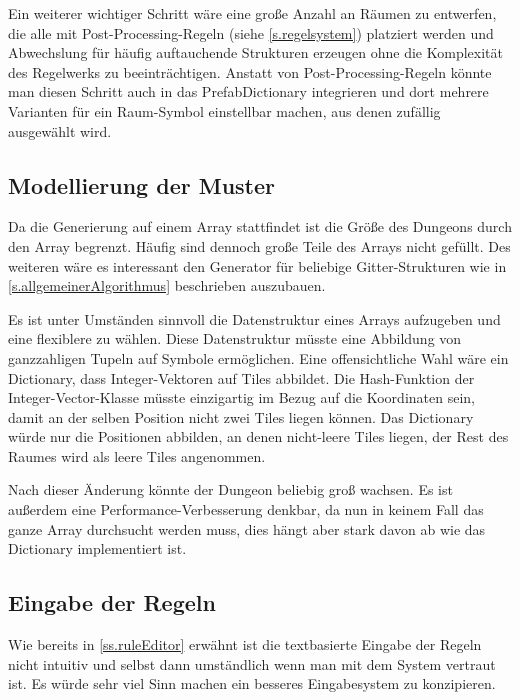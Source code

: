 Ein weiterer wichtiger Schritt wäre eine große Anzahl an Räumen zu entwerfen, die alle mit Post-Processing-Regeln (siehe \ref{s.regelsystem}) platziert werden und Abwechslung für häufig auftauchende Strukturen erzeugen ohne die Komplexität des Regelwerks zu beeinträchtigen. Anstatt von Post-Processing-Regeln könnte man diesen Schritt auch in das PrefabDictionary integrieren und dort mehrere Varianten für ein Raum-Symbol einstellbar machen, aus denen zufällig ausgewählt wird.

\subsection{Modellierung der Muster}

Da die Generierung auf einem Array stattfindet ist die Größe des Dungeons durch den Array begrenzt. Häufig sind dennoch große Teile des Arrays nicht gefüllt. Des weiteren wäre es interessant den Generator für beliebige Gitter-Strukturen wie in \ref{s.allgemeinerAlgorithmus} beschrieben auszubauen.

Es ist unter Umständen sinnvoll die Datenstruktur eines Arrays aufzugeben und eine flexiblere zu wählen. Diese Datenstruktur müsste eine Abbildung von ganzzahligen Tupeln auf Symbole ermöglichen. Eine offensichtliche Wahl wäre ein Dictionary, dass Integer-Vektoren auf Tiles abbildet. Die Hash-Funktion der Integer-Vector-Klasse müsste einzigartig im Bezug auf die Koordinaten sein, damit an der selben Position nicht zwei Tiles liegen können. Das Dictionary würde nur die Positionen abbilden, an denen nicht-leere Tiles liegen, der Rest des Raumes wird als leere Tiles angenommen. 

Nach dieser Änderung könnte der Dungeon beliebig groß wachsen. Es ist außerdem eine Performance-Verbesserung denkbar, da nun in keinem Fall das ganze Array durchsucht werden muss, dies hängt aber stark davon ab wie das Dictionary implementiert ist.

\subsection{Eingabe der Regeln}

Wie bereits in \ref{ss.ruleEditor} erwähnt ist die textbasierte Eingabe der Regeln nicht intuitiv und selbst dann umständlich wenn man mit dem System vertraut ist. Es würde sehr viel Sinn machen ein besseres Eingabesystem zu konzipieren.

